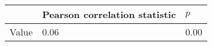 \begin{tabular}{lll}
\toprule
 & Pearson correlation statistic & $p$ \\
\midrule
Value & 0.06 & 0.00 \\
\bottomrule
\end{tabular}
